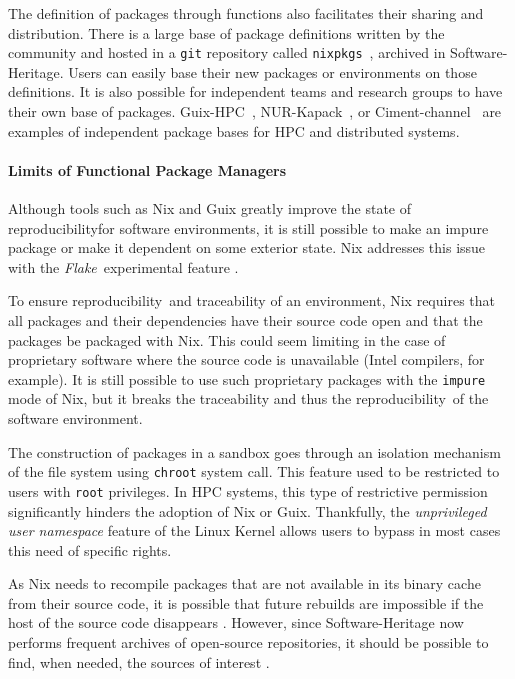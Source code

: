 \documentclass[sigconf,natbib=false]{acmart}
\newcommand{\repro}{reproducibility}
\begin{document}
The definition of packages through functions also facilitates their sharing and distribution.
There is a large base of package definitions written by the community and hosted in a \texttt{git} repository called \texttt{nixpkgs}\ \cite{nixpkgs, repology}, archived in Software-Heritage.
Users can easily base their new packages or environments on those definitions.
It is also possible for independent teams and research groups to have their own base of packages.
Guix-HPC\ \cite{guix-hpc}, NUR-Kapack\ \cite{kapack}, or Ciment-channel\ \cite{ciment_channel} are examples of independent package bases for HPC and distributed systems.

\paragraph{Limits of Functional Package Managers}

Although tools such as Nix and Guix greatly improve the state of \repro for software environments, it is still possible to make an impure package or make it dependent on some exterior state.
Nix addresses this issue with the \emph{Flake}\ experimental feature \cite{flakes}.

To ensure \repro\ and traceability of an environment, Nix requires that all packages and their dependencies have their source code open and that the packages be packaged with Nix.
This could seem limiting in the case of proprietary software where the source code is unavailable (Intel compilers, for example).
It is still possible to use such proprietary packages with the \texttt{impure} mode of Nix, but it breaks the traceability and thus the \repro\ of the software environment. 

The construction of packages in a sandbox goes through an isolation mechanism of the file system using \texttt{chroot} system call.
This feature used to be restricted to users with \texttt{root} privileges.
In HPC systems, this type of restrictive permission significantly hinders the adoption of Nix or Guix.
Thankfully, the \emph{unprivileged user namespace} feature of the Linux Kernel allows users to bypass in most cases this need of specific rights.

As Nix needs to recompile packages that are not available in its binary cache from their source code, it is possible that future rebuilds are impossible if the host of the source code disappears \cite{blinry}.
However, since Software-Heritage now performs frequent archives of open-source repositories, it should be possible to find, when needed, the sources of interest \cite{courtesconnecting}.
\end{document}
